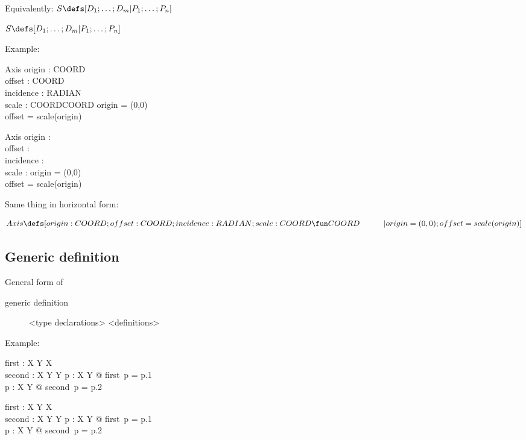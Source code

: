 \documentclass[reqno,12pt]{tufte-handout}
\numberwithin{equation}{subsection}
\numberwithin{equation}{subsection}
\begin{document}
\noindent Equivalently: \(S\defs [D_1;\ldots ;D_m | P_1;\ldots ;P_n]\)
\begin{marginfigure}
  \(S\defs [D_1;\ldots ;D_m | P_1;\ldots ;P_n]\)
\end{marginfigure}

Example:

\begin{marginfigure}[24pt]
  \begin{schema}{Axis}
    origin : COORD \\
    offset : COORD \\
    incidence : RADIAN \\
    scale : COORD\fun COORD
    \where
    origin = (0,0) \\
    offset = scale(origin)
  \end{schema}
\end{marginfigure}
\begin{schema}{Axis}
  origin : \real\cross\real \\
  offset : \real\cross\real \\
  incidence : \real \\
  scale : \real\fun\real
  \where
  origin = (0,0) \\
  offset = scale(origin)
\end{schema}

Same thing in horizontal form:

\[Axis \defs [origin:COORD;offset:COORD;incidence:RADIAN;scale:COORD\fun COORD \\
  \quad\quad\quad | origin=(0,0); offset=scale(origin)]\]

\subsection{Generic definition}
\label{subs:zfndefns}

General form of

\begin{description}
\item [generic definition]
  \begin{gendef}[X,Y]
    <type declarations>
    \where
    <definitions>
  \end{gendef}
\end{description}

Example:

\begin{gendef}[X,Y]
  first : X \cross Y \rightarrow X \\
  second : X \cross Y \rightarrow Y
  \where
  \forall p : X \cross Y @ first\ p = p.1 \\
  \forall p : X \cross Y @ second\ p = p.2
\end{gendef}
\begin{marginfigure}[-12pt]
  \begin{gendef}[X,Y]
    first : X \cross Y \rightarrow X \\
    second : X \cross Y \rightarrow Y
    \where
    \forall p : X \cross Y @ first\ p = p.1 \\
    \forall p : X \cross Y @ second\ p = p.2
  \end{gendef}
\end{marginfigure}
\end{document}
